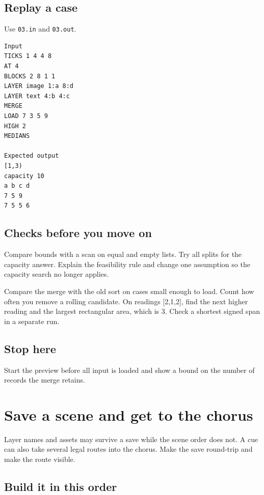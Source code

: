 \documentclass[11pt,letterpaper]{article}
\begin{document}
\subsection*{Replay a case}

Use \texttt{03.in} and \texttt{03.out}.

\begin{samepage}
\small
\begin{verbatim}
Input
TICKS 1 4 4 8
AT 4
BLOCKS 2 8 1 1
LAYER image 1:a 8:d
LAYER text 4:b 4:c
MERGE
LOAD 7 3 5 9
HIGH 2
MEDIANS

Expected output
[1,3)
capacity 10
a b c d
7 5 9
7 5 5 6
\end{verbatim}
\end{samepage}

\subsection*{Checks before you move on}

Compare bounds with a scan on equal and empty lists. Try all splits for the capacity answer. Explain the feasibility rule and change one assumption so the capacity search no longer applies.

Compare the merge with the old sort on cases small enough to load. Count how often you remove a rolling candidate. On readings [2,1,2], find the next higher reading and the largest rectangular area, which is 3. Check a shortest signed span in a separate run.

\subsection*{Stop here}

Start the preview before all input is loaded and show a bound on the number of records the merge retains.

\clearpage

\section{Save a scene and get to the chorus}\label{visuals:04}

Layer names and assets may survive a save while the scene order does not. A cue can also take several legal routes into the chorus. Make the save round-trip and make the route visible.

\subsection*{Build it in this order}
\end{document}
